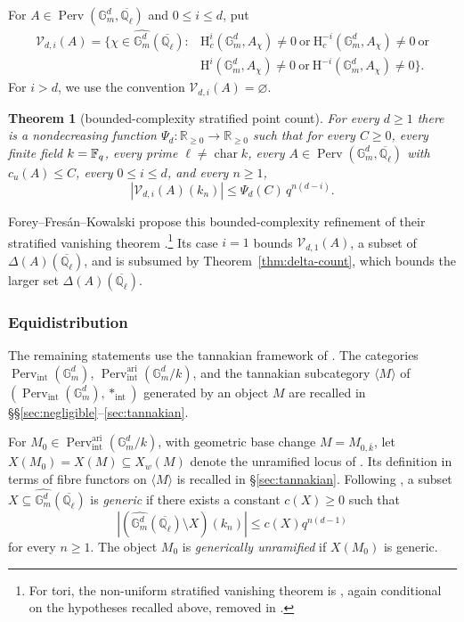 \documentclass[12pt,reqno]{amsart}
\theoremstyle{definition}
\theoremstyle{plain}
\newtheorem{thm}[para]{Theorem}
\theoremstyle{definition}
\theoremstyle{remark}
\newcommand{\bbG}{\mathbb{G}}  \newcommand{\bbH}{\mathbb{H}}
\newcommand{\bbQ}{\mathbb{Q}}  \newcommand{\bbR}{\mathbb{R}}
\newcommand{\HH}{\mathrm{H}}  \newcommand{\JJ}{\mathrm{J}}
\newcommand{\ol}[1]{\overline{#1}}
\newcommand{\Ql}{\bbQ_{\ell}}
\newcommand{\Gm}{\bbG_m}
\newcommand{\Perv}{\operatorname{Perv}}
\newcommand{\cu}{c_u}
\begin{document}
For \(A\in\Perv(\Gm^d,\ol\Ql)\) and \(0\le i\le d\), put
\begin{equation}
\label{eq:cohomology-jump-loci}
\begin{aligned}
 \mathcal V_{d,i}(A)=\bigl\{\chi\in\widehat{\Gm^d}(\ol\Ql):{}&
 \HH^{i}_c(\Gm^d,A_\chi)\neq0\ \text{or}\ \HH^{-i}_c(\Gm^d,A_\chi)\neq0\ \text{or}\\
 &\HH^{i}(\Gm^d,A_\chi)\neq0\ \text{or}\ \HH^{-i}(\Gm^d,A_\chi)\neq0\bigr\}.
\end{aligned}
\end{equation}
For \(i>d\), we use the convention \(\mathcal V_{d,i}(A)=\varnothing\).

\begin{thm}[bounded-complexity stratified point count]
\label{thm:stratified}
For every \(d\ge1\) there is a nondecreasing function
\(\Psi_{d}:\mathbb R_{\ge0}\to\mathbb R_{\ge0}\) such that for every \(C\ge0\), every finite field
\(k=\mathbb{F}_q\), every prime \(\ell\neq\operatorname{char}k\), every \(A\in\Perv(\Gm^d,\ol\Ql)\) with
\(\cu(A)\le C\), every \(0\le i\le d\), and every \(n\ge1\),
\[
        |\mathcal V_{d,i}(A)(k_n)|\le\Psi_{d}(C)\,q^{n(d-i)} .
\]
\end{thm}

Forey--Fres\'an--Kowalski propose this bounded-complexity refinement of their stratified
vanishing theorem \cite[Th.~2.3, Rem.~2.4]{ForeyFresanKowalski2021}.\footnote{For tori, the
non-uniform stratified vanishing theorem is
\cite[Th.~3.4.1, Prop.~6.3.2, Th.~6.3.3]{GabberLoeser1996}, again conditional on the hypotheses
recalled above, removed in \cite[Cor.~2.16]{ForeyFresanKowalski2021}.}  Its case \(i=1\) bounds
\(\mathcal V_{d,1}(A)\), a subset of
\(\Delta(A)(\ol\Ql)\), and is subsumed by Theorem~\ref{thm:delta-count}, which bounds the larger set
\(\Delta(A)(\ol\Ql)\).

\subsubsection{Equidistribution}
\label{sec:equidistribution}

The remaining statements use the tannakian framework of \cite{ForeyFresanKowalski2021}.  The categories
\(\Perv_{\mathrm{int}}(\Gm^d)\), \(\Perv_{\mathrm{int}}^{\mathrm{ari}}(\Gm^d/k)\), and the tannakian
subcategory \(\langle M\rangle\) of \((\Perv_{\mathrm{int}}(\Gm^d),\ast_{\mathrm{int}})\) generated by an
object \(M\) are recalled in \S\S\ref{sec:negligible}--\ref{sec:tannakian}.

For \(M_0\in\Perv_{\mathrm{int}}^{\mathrm{ari}}(\Gm^d/k)\), with geometric base change
\(M=M_{0,\bar k}\), let \(X(M_0)=X(M)\subseteq X_w(M)\) denote the unramified locus of
\cite[Def.~3.25, \S3.8]{ForeyFresanKowalski2021}.  Its definition in terms of fibre functors on
\(\langle M\rangle\) is recalled in \S\ref{sec:tannakian}.
Following \cite[Def.~1.22]{ForeyFresanKowalski2021}, a subset
\(X\subseteq\widehat{\Gm^d}(\ol\Ql)\) is \emph{generic} if there exists a constant \(c(X)\ge0\) such that
\[
        |(\widehat{\Gm^d}(\ol\Ql)\setminus X)(k_n)|\le c(X)q^{n(d-1)}
\]
for every \(n\ge1\).  The object \(M_0\) is \emph{generically unramified} if \(X(M_0)\) is generic.
\end{document}
